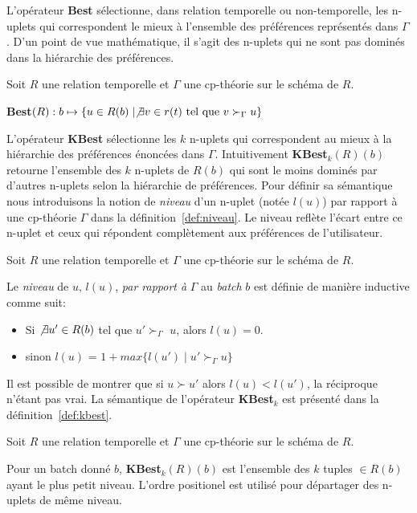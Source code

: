 L'opérateur \textbf{Best} sélectionne, dans relation temporelle ou non-temporelle, les n-uplets qui correspondent le mieux à l'ensemble des préférences représentés dans $\Gamma$. D'un point de vue mathématique, il s'agit des n-uplets qui ne sont pas dominés dans la hiérarchie des préférences.

\begin{defi}[Best]\label{def:best}
Soit $R$ une relation temporelle et $\Gamma$ une cp-th\'eorie sur le schéma de $R$. 

\textbf{Best}$(R): b\mapsto \{u \in R(b) \mid \not\exists v \in r(t) \textrm{ tel que } v \succ_\Gamma u \}$
\end{defi}

L'opérateur \textbf{KBest} sélectionne les $k$ n-uplets qui correspondent au mieux à la hiérarchie des préférences énoncées dans $\Gamma$. Intuitivement \textbf{KBest}$_k(R)(b)$ retourne l'ensemble des $k$ n-uplets de $R(b)$ qui sont le moins dominés par d'autres n-uplets selon la hiérarchie de préférences. Pour définir sa sémantique nous introduisons la notion de \textit{niveau} d'un n-uplet (notée $l(u)$) par rapport à une cp-théorie $\Gamma$ dans la définition~\ref{def:niveau}. Le niveau reflète l'écart entre ce n-uplet et ceux qui répondent complètement aux préférences de l'utilisateur.

\begin{defi}[Niveau]\label{def:niveau}
Soit $R$ une relation temporelle et $\Gamma$ une cp-th\'eorie sur le schéma de $R$.

Le \textit{niveau} de $u$, $l(u)$, \textit{par rapport à} $\Gamma$ au \textit{batch} $b$ est définie de manière inductive comme suit:
 \begin{itemize}
 \item Si $\not\exists u' \in R(b)$ tel que $u' \succ_\Gamma$ $u$, alors $l(u) = 0$.
 \item sinon $l(u)$ = $1+max \{l(u') \mid u' \succ_\Gamma u\} $
 \end{itemize}
\end{defi}

Il est possible de montrer que si $u \succ u'$ alors $l(u) < l(u')$, la réciproque n'étant pas vrai. La sémantique de l'opérateur \textbf{KBest}$_k$ est présenté dans la définition~\ref{def:kbest}.

\begin{defi}[KBest]\label{def:kbest}
Soit $R$ une relation temporelle et $\Gamma$ une cp-th\'eorie sur le schéma de $R$. 

Pour un batch donné $b$, \textbf{KBest}$_k(R)(b)$ est l'ensemble des $k$ tuples $\in R(b)$ ayant le plus petit niveau. L'ordre positionel est utilisé pour départager des n-uplets de même niveau.
\end{defi}

